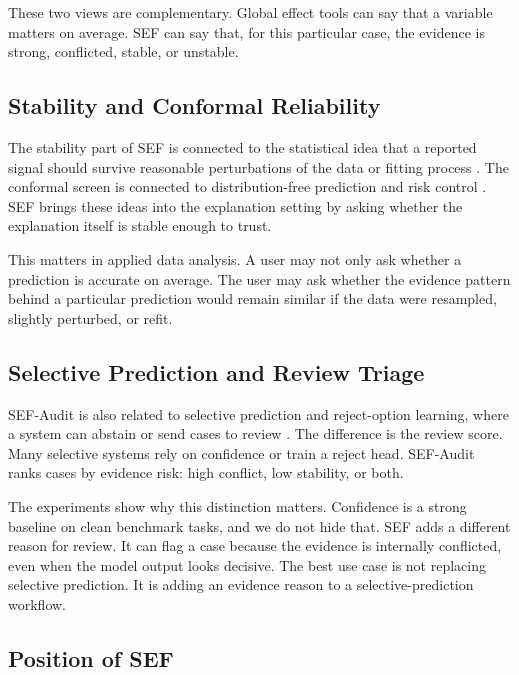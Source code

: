 \documentclass[11pt]{article}
\begin{document}
These two views are complementary. Global effect tools can say that a variable matters on average. SEF can say that, for this particular case, the evidence is strong, conflicted, stable, or unstable.

\subsection{Stability and Conformal Reliability}

The stability part of SEF is connected to the statistical idea that a reported signal should survive reasonable perturbations of the data or fitting process \citep{meinshausen2010stability}. The conformal screen is connected to distribution-free prediction and risk control \citep{shafer2008tutorial,angelopoulos2021gentle,bates2021distribution}. SEF brings these ideas into the explanation setting by asking whether the explanation itself is stable enough to trust.

This matters in applied data analysis. A user may not only ask whether a prediction is accurate on average. The user may ask whether the evidence pattern behind a particular prediction would remain similar if the data were resampled, slightly perturbed, or refit.

\subsection{Selective Prediction and Review Triage}

SEF-Audit is also related to selective prediction and reject-option learning, where a system can abstain or send cases to review \citep{geifman2017selective,geifman2019selectivenet}. The difference is the review score. Many selective systems rely on confidence or train a reject head. SEF-Audit ranks cases by evidence risk: high conflict, low stability, or both.

The experiments show why this distinction matters. Confidence is a strong baseline on clean benchmark tasks, and we do not hide that. SEF adds a different reason for review. It can flag a case because the evidence is internally conflicted, even when the model output looks decisive. The best use case is not replacing selective prediction. It is adding an evidence reason to a selective-prediction workflow.

\subsection{Position of SEF}
\end{document}
